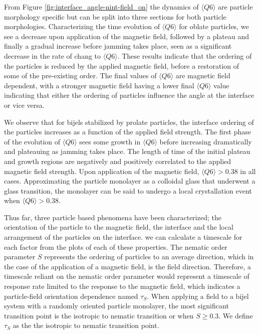 From Figure \ref{fig:interface_angle-nint-field_on} the dynamics of $\langle Q6 \rangle$ are particle morphology specific but can be split into three sections for 
both particle morphologies. Characterizing the time evolution of $\langle Q6 \rangle$ for oblate particles, we see a decrease upon application of the magnetic field, 
followed by a plateau and finally a gradual increase before jamming takes place, seen as a significant decrease in the rate of chang to $\langle Q6 \rangle$.
These results indicate that the ordering of the particles is reduced by the applied magnetic field, before a
restoration of some of the pre-existing order. The final values of $\langle Q6 \rangle$ are magnetic field dependent, with a stronger
magnetic field having a lower final $\langle Q6 \rangle$ value indicating that either the ordering of particles influence the angle at
the interface or vice versa. 

We observe that for bijels stabilized by prolate particles, the interface ordering of the particles increases as a
function of the applied field strength. The first phase of the evolution of $\langle Q6 \rangle$ sees some growth in $\langle Q6 \rangle$ before 
increasing dramatically and plateauing as jamming takes place. The length of time of the initial plateau and growth regions are negatively and
positively correlated to the applied magnetic field strength. Upon application of the magnetic field, $\langle Q6 \rangle > 0.38$ in all cases. Approximating
the particle monolayer as a colloidal glass that underwent a glass transition, the monolayer can be said to undergo a local crystallation event when 
$\langle Q6 \rangle > 0.38$. \cite{toxvaerd_role_2020}

Thus far, three particle based phenomena have been characterized; the orientation of the particle to the magnetic field, the interface and the local 
arrangement of the particles on the interface. we can calculate a timescale for each factor from the plots of each of these properties.
The nematic order parameter $S$ represents the ordering of
particles to an average direction, which in the case of the application
of a magnetic field, is the field direction. Therefore, a timescale
reliant on the nematic order parameter would represent a timescale of
response rate limited to the response to the magnetic field, which
indicates a particle-field orientation dependence named $\tau_S$. When applying a field to a bijel system with a
randomly oriented particle monolayer, the most significant transition
point is the isotropic to nematic transition or when $S \geq 0.3$. We
define $\tau_S$ as the the isotropic to nematic transition point.


